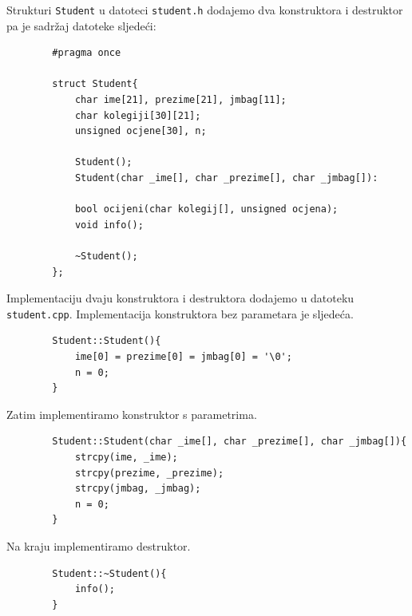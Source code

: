 \begin{rjesenje}
    Strukturi \texttt{Student} u datoteci \texttt{student.h} dodajemo dva konstruktora i destruktor pa je sadržaj datoteke sljedeći:
 \begin{verbatim}
        #pragma once

        struct Student{
            char ime[21], prezime[21], jmbag[11];
            char kolegiji[30][21];
            unsigned ocjene[30], n;

            Student();
            Student(char _ime[], char _prezime[], char _jmbag[]):

            bool ocijeni(char kolegij[], unsigned ocjena);
            void info();

            ~Student();
        };
    \end{verbatim}

    Implementaciju dvaju konstruktora i destruktora dodajemo u datoteku \texttt{student.cpp}. Implementacija konstruktora bez parametara je sljedeća.
    \begin{verbatim}
        Student::Student(){
            ime[0] = prezime[0] = jmbag[0] = '\0';
            n = 0;
        }
    \end{verbatim}

    Zatim implementiramo konstruktor s parametrima.
      \begin{verbatim}
        Student::Student(char _ime[], char _prezime[], char _jmbag[]){
            strcpy(ime, _ime);
            strcpy(prezime, _prezime);
            strcpy(jmbag, _jmbag);
            n = 0;
        }
    \end{verbatim}

    Na kraju implementiramo destruktor.
    \begin{verbatim}
        Student::~Student(){
            info();
        }
    \end{verbatim}

\end{rjesenje}

